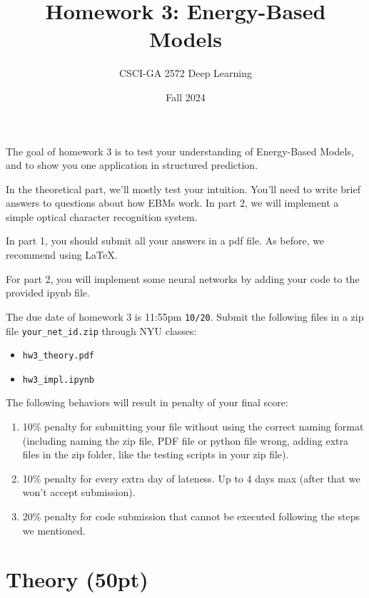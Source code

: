 \documentclass{article}
\title{Homework 3: Energy-Based Models}
\author{CSCI-GA 2572 Deep Learning}
\date{Fall 2024}
\begin{document}
\maketitle

The goal of homework 3 is to test your understanding of Energy-Based Models, and to show you one application in structured prediction.

In the theoretical part, we'll mostly test your intuition. You'll need to write brief answers to questions about how EBMs work. In part 2, we will implement a simple optical character recognition system. 

In part 1, you should submit all your answers in a pdf file. As before, we recommend using \LaTeX. 

For part 2, you will implement some neural networks by adding your code to the provided ipynb file.

The due date of homework 3 is 11:55pm \texttt{10/20}.
Submit the following files in a zip file \texttt{your\_net\_id.zip} through NYU classes:
\begin{itemize}
\item \texttt{hw3\_theory.pdf}
\item \texttt{hw3\_impl.ipynb}
\end{itemize}

The following behaviors will result in penalty of your final score:
\begin{enumerate}
\item 10\% penalty for submitting your file without using the correct naming format (including naming the zip file, PDF file or python file wrong, adding extra files in the zip folder, like the testing scripts in your zip file). 
\item 10\% penalty for every extra day of lateness. Up to 4 days max (after that we won't accept submission).
\item 20\% penalty for code submission that cannot be executed following the steps we mentioned.
\end{enumerate}

\section{Theory (50pt)}
\end{document}
